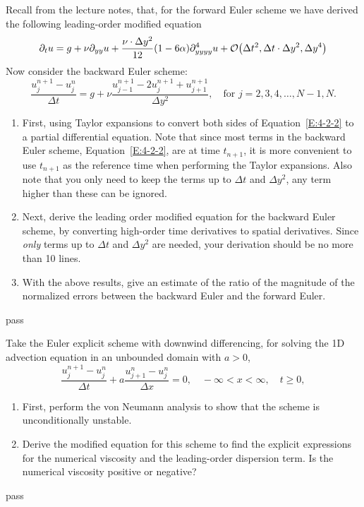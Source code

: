 \begin{homework}[label={H:4-2}]
    Recall from the lecture notes, that, for the forward Euler scheme we have derived the following leading-order modified equation
    \begin{equation}\label{E:4-2-1}
        \partial_t u = g + \nu\partial_{yy} u + \frac{\nu\cdot\Delta y^2}{12}(1-6\alpha)\partial_{yyyy}^4 u + \order{\Delta t^2, \Delta t\cdot\Delta y^2, \Delta y^4}
    \end{equation}
    Now consider the backward Euler scheme:
    \begin{equation}\label{E:4-2-2}
        \frac{u_j^{n+1}-u_j^n}{\Delta t} = g + \nu\frac{u_{j-1}^{n+1}-2u_j^{n+1}+u_{j+1}^{n+1}}{\Delta y^2}, \quad
        \text{for } j=2, 3, 4, \ldots, N-1, N.
    \end{equation}

    \begin{enumerate}[label=(\alph*)]
        \item First, using Taylor expansions to convert both sides of Equation~\eqref{E:4-2-2} to a partial differential equation. Note that since most terms in the backward Euler scheme, Equation~\eqref{E:4-2-2}, are at time $t_{n+1}$, it is more convenient to use $t_{n+1}$ as the reference time when performing the Taylor expansions. Also note that you only need to keep the terms up to $\Delta t$ and $\Delta y^2$, any term higher than these can be ignored.
        \item Next, derive the leading order modified equation for the backward Euler scheme, by converting high-order time derivatives to spatial derivatives. Since \emph{only} terms up to $\Delta t$ and $\Delta y^2$ are needed, your derivation should be no more than 10 lines.
        \item With the above results, give an estimate of the ratio of the magnitude of the normalized errors between the backward Euler and the forward Euler.        
    \end{enumerate}
\end{homework}

pass



\begin{homework}[label={H:4-3}]
    Take the Euler explicit scheme with downwind differencing, for solving the 1D advection equation in an unbounded domain with $a>0$,
    \begin{equation}\label{E:4-3-1}
        \frac{u_j^{n+1} - u_j^n}{\Delta t} + a\frac{u_{j+1}^n-u_j^n}{\Delta x} = 0, \quad
        -\infty<x<\infty, \quad t\geq 0,
    \end{equation}

    \begin{enumerate}[label=(\alph*)]
        \item First, perform the von Neumann analysis to show that the scheme is unconditionally unstable.
        \item Derive the modified equation for this scheme to find the explicit expressions for the numerical viscosity and the leading-order dispersion term. Is the numerical viscosity positive or negative?
    \end{enumerate}
\end{homework}

pass

